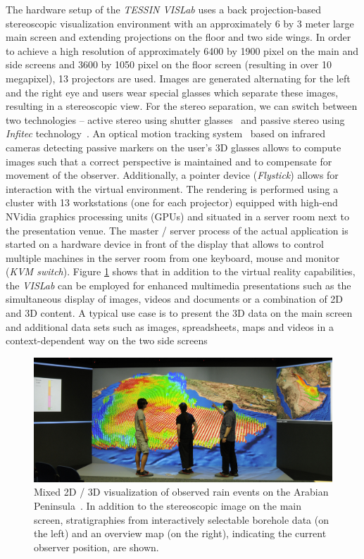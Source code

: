 \documentclass[twocolumn]{svjour3}          %
\begin{document}
The hardware setup of the \emph{TESSIN VISLab} uses a back projection-based stereoscopic visualization environment with an approximately 6 by 3 meter large main screen and extending projections on the floor and two side wings. In order to achieve a high resolution of approximately 6400 by 1900 pixel on the main and side screens and 3600 by 1050 pixel on the floor screen (resulting in over 10 megapixel), 13 projectors are used. Images are generated alternating for the left and the right eye and users wear special glasses which separate these images, resulting in a stereoscopic view. For the stereo separation, we can switch between two technologies -- active stereo using shutter glasses~\cite{activestereo} and passive stereo using \emph{Infitec} technology~\cite{infitec}. An optical motion tracking system~\cite{tracking} based on infrared cameras detecting passive markers on the user's 3D glasses allows to compute images such that a correct perspective is maintained and to compensate for movement of the observer. Additionally, a pointer device (\emph{Flystick}) allows for interaction with the virtual environment. The rendering is performed using a cluster with 13 workstations (one for each projector) equipped with high-end NVidia graphics processing units (GPUs) and situated in a server room next to the presentation venue. The master / server process of the actual application is started on a hardware device in front of the display that allows to control multiple machines in the server room from one keyboard, mouse and monitor (\emph{KVM switch}). Figure \ref{fig:sa}  shows that in addition to the virtual reality capabilities, the \emph{VISLab} can be employed for enhanced multimedia presentations such as the simultaneous display of images, videos and documents or a combination of 2D and 3D content. A typical use case is to present the 3D data on the main screen and additional data sets such as images, spreadsheets, maps and videos in a context-dependent way on the two side screens~\cite{zehner:2d3d}

\begin{figure}
  \includegraphics[width=1.0\textwidth]{images/sa_2d_3d.jpg}
\caption{Mixed 2D / 3D visualization of observed rain events on the Arabian Peninsula~\cite{rink:iwas}. In addition to the stereoscopic image on the main screen, stratigraphies from interactively selectable borehole data (on the left) and an overview map (on the right), indicating the current observer position, are shown.}
\label{fig:sa}
\end{figure}
\end{document}
